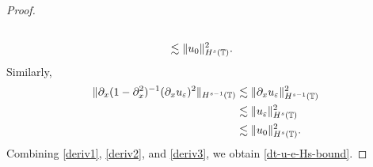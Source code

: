 \begin{proof}
\begin{equation}
\begin{split}
\\
& \lesssim  \|u_0\|^2_{H^s(\mathbb{T})}.
\end{split}
\end{equation}
Similarly,
\begin{equation}
\begin{split}
\label{deriv3}
\|\partial_x (1-\partial_x^2)^{-1} (\partial_x u_\varepsilon)^2\|_{H^{s-1}(\mathbb{T})}
& \lesssim \|\partial_x u_\varepsilon\|^2_{H^{s-1}(\mathbb{T})} 
\\
& \lesssim  \|u_\varepsilon \|^2_{H^s(\mathbb{T})}
\\
& \lesssim \|u_0\|^2_{H^s(\mathbb{T})}.
\end{split}
\end{equation}
Combining \eqref{deriv1}, \eqref{deriv2}, and \eqref{deriv3}, we
obtain \eqref{dt-u-e-Hs-bound}. 
\end{proof}
%
%
